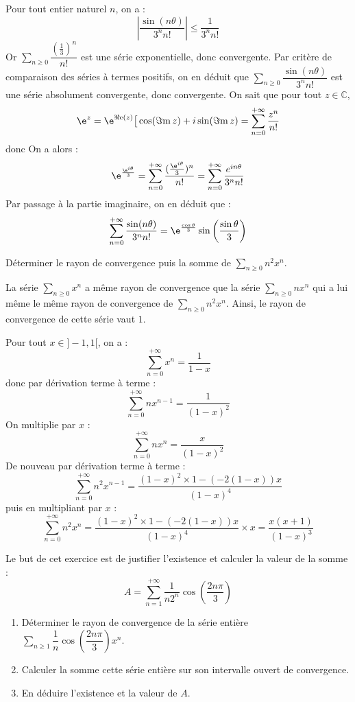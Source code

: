 \documentclass[a4paper,10pt]{report}
\newcommand{\Sum}[2]{\ensuremath{\textstyle{\sum\limits_{#1}^{#2}}}}
\begin{document}
\corr Pour tout entier naturel $n$, on a : 
\[
\left\vert\dfrac{\sin(n\theta)}{3^n n!}\right\vert\leq \dfrac{1}{3^n n!}
\]
Or $\Sum{n \geq 0}{} \dfrac{(\frac{1}{3})^n}{ n!}$ est une série exponentielle, donc convergente. Par critère de comparaison des séries à termes positifs, on en déduit que $\Sum{n \geq 0}{} \dfrac{\sin(n\theta)}{3^n n!}$ est une série absolument convergente, donc convergente. On sait que pour tout $z \in \mathbb{C}$,
$$\e^{z}=\e^{\Re\mathrm{e}(z)}\big[\cos(\Im\mathrm{m}\,z)+i\sin(\Im\mathrm{m}\,z)= \sum_{n =0}^{+ \infty} \dfrac{z^n}{n!}$$
donc 
On a alors : 
$$ \e^{\frac{\e^{i\theta}}{3}}= \sum_{n=0}^{+\infty}\dfrac{(\frac{\e^{i\theta}}{3})^n}{n!} = \sum_{n=0}^{+ \infty} \dfrac{e^{i n \theta}}{3^n n!}$$
Par passage à la partie imaginaire, on en déduit que :
$$ \sum_{n=0}^{+\infty}\dfrac{\sin(n\theta)}{3^nn!} = \e^{\frac{\cos\theta}{3}}\sin\left(\dfrac{\sin\theta}{3}\right)$$

\begin{Exa} Déterminer le rayon de convergence puis la somme de $\Sum{n \geq 0}{} n^2x^n$.
\end{Exa}

\corr La série $\Sum{n \geq 0}{} x^n$ a même rayon de convergence que  la série $\Sum{n \geq 0}{} nx^n$ qui a lui même le même rayon de convergence de $\Sum{n \geq 0}{} n^2x^n$. Ainsi, le rayon de convergence de cette série vaut $1$.

\medskip

\noindent Pour tout $x \in ]-1,1[$, on a :
$$ \sum_{n=0}^{+\infty}x^n  =  \dfrac{1}{1-x} $$
donc par dérivation terme à terme :
$$ \sum_{n=0}^{+\infty} nx^{n-1}  =  \dfrac{1}{(1-x)^2} $$
On multiplie par $x$ :
$$ \sum_{n=0}^{+\infty} nx^{n}  =  \dfrac{x}{(1-x)^2} $$
De nouveau par dérivation terme à terme :
$$ \sum_{n=0}^{+\infty} n^2 x^{n-1} = \dfrac{(1-x)^2\times 1-(-2(1-x))x}{(1-x)^4}$$
puis en multipliant par $x$ :
$$ \sum_{n=0}^{+\infty} n^2 x^{n}= \dfrac{(1-x)^2\times 1-(-2(1-x))x}{(1-x)^4} \times x  = \dfrac{x(x+1)}{(1-x)^3}$$

\begin{Exa} Le but de cet exercice est de justifier l'existence et calculer la valeur de la somme :  
\[
A=\sum_{n=1}^{+\infty}\dfrac{1}{n2^n}\cos\left(\dfrac{2n\pi}{3}\right)
\]
\begin{enumerate}
\item Déterminer le rayon de convergence de la série entière $\Sum{n \geq 1}{} \dfrac{1}{n}\cos\left(\dfrac{2n\pi}{3}\right)x^n$.
\item Calculer la somme cette série entière sur son intervalle ouvert de convergence.
\item En déduire l'existence et la valeur de $A$.
\end{enumerate}
\end{Exa}
\end{document}

